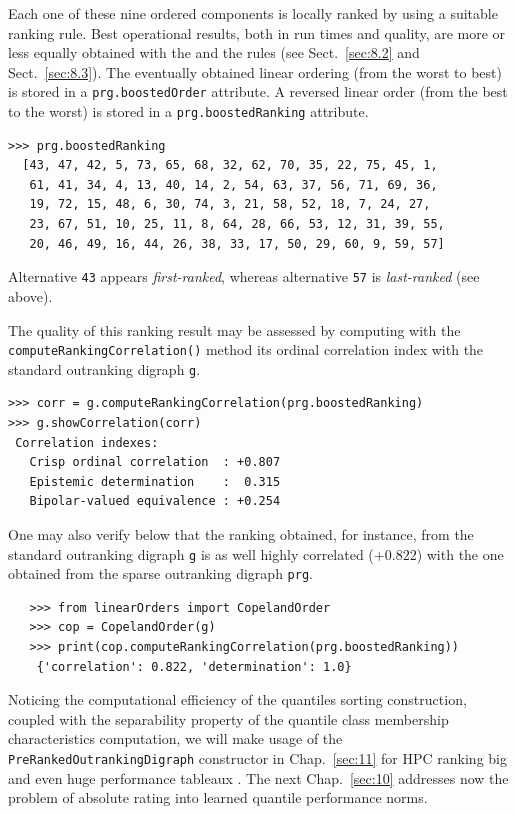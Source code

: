 Each one of these nine ordered components is locally ranked by using a suitable ranking rule. Best operational results, both in run times and quality, are more or less equally obtained with the \Copeland and the \NetFlows rules (see Sect.~\ref{sec:8.2} and Sect.~\ref{sec:8.3}). The eventually obtained linear ordering (from the worst to best) is stored in a \texttt{prg.boostedOrder} attribute. A reversed linear order (from the best to the worst) is stored in a \texttt{prg.boostedRanking} attribute.
  \begin{lstlisting}
>>> prg.boostedRanking
  [43, 47, 42, 5, 73, 65, 68, 32, 62, 70, 35, 22, 75, 45, 1,
   61, 41, 34, 4, 13, 40, 14, 2, 54, 63, 37, 56, 71, 69, 36,
   19, 72, 15, 48, 6, 30, 74, 3, 21, 58, 52, 18, 7, 24, 27,
   23, 67, 51, 10, 25, 11, 8, 64, 28, 66, 53, 12, 31, 39, 55,
   20, 46, 49, 16, 44, 26, 38, 33, 17, 50, 29, 60, 9, 59, 57]
\end{lstlisting}

Alternative \texttt{43} appears \emph{first-ranked}, whereas alternative \texttt{57} is \emph{last-ranked} (see above).

The quality of this ranking result may be assessed by computing with the \texttt{computeRankingCorrelation()} method its ordinal correlation index with the standard outranking digraph \texttt{g}.  
\begin{lstlisting}
>>> corr = g.computeRankingCorrelation(prg.boostedRanking)
>>> g.showCorrelation(corr)
 Correlation indexes:
   Crisp ordinal correlation  : +0.807
   Epistemic determination    :  0.315
   Bipolar-valued equivalence : +0.254
\end{lstlisting}

One may also verify below that the \Copeland ranking obtained, for instance, from the standard outranking digraph \texttt{g} is as well highly correlated ($+0.822$) with the one obtained from the sparse outranking digraph \texttt{prg}.
\begin{lstlisting}
   >>> from linearOrders import CopelandOrder
   >>> cop = CopelandOrder(g)
   >>> print(cop.computeRankingCorrelation(prg.boostedRanking))
    {'correlation': 0.822, 'determination': 1.0}
\end{lstlisting}

\vspace{\baselineskip}
Noticing the computational efficiency of the quantiles sorting construction, coupled with the separability property of the quantile class membership characteristics computation, we will make usage of the \texttt{PreRankedOutrankingDigraph} constructor in Chap.~\ref{sec:11} for HPC ranking big and even huge performance tableaux \citep{BIS-2016}. The next Chap.~\ref{sec:10} addresses now the problem of absolute rating into learned quantile performance norms.


%
%
 
